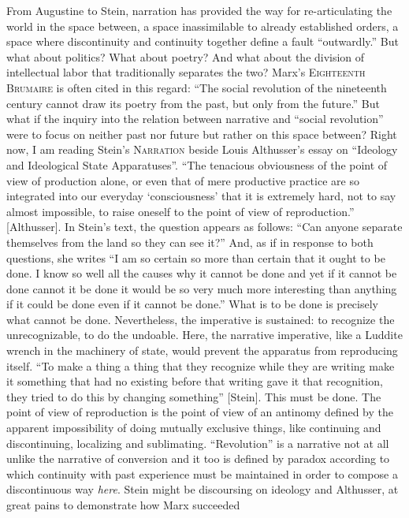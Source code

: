 \documentclass[
]{memoir}
\begin{document}
From Augustine to Stein, narration has provided the way for
re-articulating the world in the space between, a space inassimilable to
already established orders, a space where discontinuity and continuity
together define a fault ``outwardly.'' But what about politics? What
about poetry? And what about the division of intellectual labor that
traditionally separates the two? Marx's \textsc{Eighteenth Brumaire} is
often cited in this regard: ``The social revolution of the nineteenth
century cannot draw its poetry from the past, but only from the
future.'' But what if the inquiry into the relation between narrative
and ``social revolution'' were to focus on neither past nor future but
rather on this space between? Right now, I am reading Stein's
\textsc{Narration} beside Louis Althusser's essay on ``Ideology and
Ideological State Apparatuses''. ``The tenacious obviousness of the
point of view of production alone, or even that of mere productive
practice are so integrated into our everyday `consciousness' that it is
extremely hard, not to say almost impossible, to raise oneself to the
point of view of reproduction.'' {[}Althusser{]}. In Stein's text, the
question appears as follows: ``Can anyone separate themselves from the
land so they can see it?'' And, as if in response to both questions, she
writes ``I am so certain so more than certain that it ought to be done.
I know so well all the causes why it cannot be done and yet if it cannot
be done cannot it be done it would be so very much more interesting than
anything if it could be done even if it cannot be done.'' What is to be
done is precisely what cannot be done. Nevertheless, the imperative is
sustained: to recognize the unrecognizable, to do the undoable. Here,
the narrative imperative, like a Luddite wrench in the machinery of
state, would prevent the apparatus from reproducing itself. ``To make a
thing a thing that they recognize while they are writing make it
something that had no existing before that writing gave it that
recognition, they tried to do this by changing something'' {[}Stein{]}.
This must be done. The point of view of reproduction is the point of
view of an antinomy defined by the apparent impossibility of doing
mutually exclusive things, like continuing and discontinuing, localizing
and sublimating. ``Revolution'' is a narrative not at all unlike the
narrative of conversion and it too is defined by paradox according to
which continuity with past experience must be maintained in order to
compose a discontinuous way \emph{here}. Stein might be discoursing on
ideology and Althusser, at great pains to demonstrate how Marx succeeded
\end{document}

